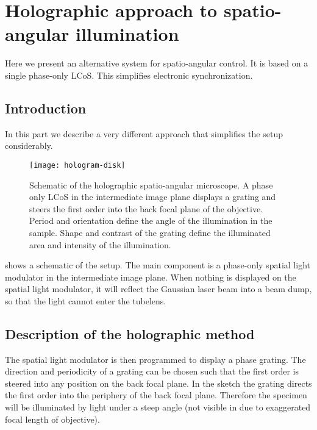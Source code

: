 \chapter{Holographic approach to spatio-angular illumination}
\begin{summary}
  Here we present an alternative system for spatio-angular control. It
  is based on a single phase-only LCoS. This simplifies electronic
  synchronization.
\end{summary}

\section{Introduction}
In this part we describe a very different approach that simplifies the
setup considerably.

\begin{figure}[!hbt]
  \centering
  
  \texttt{[image: hologram-disk]}
  \caption{Schematic of the holographic spatio-angular microscope. A
    phase only LCoS in the intermediate image plane displays a grating
    and steers the first order into the back focal plane of the
    objective. Period and orientation define the angle of the
    illumination in the sample. Shape and contrast of the grating
    define the illuminated area and intensity of the illumination.}
  \label{fig:holo-setup3}
\end{figure}

 shows a schematic of the setup. The main
component is a phase-only spatial light modulator in the intermediate
image plane. When nothing is displayed on the spatial light modulator,
it will reflect the Gaussian laser beam into a beam dump, so that
the light cannot enter the tubelens.

\section{Description of the holographic method}
The spatial light modulator is then programmed to display a phase
grating.  The direction and periodicity of a grating can be chosen
such that the first order is steered into any position on the back
focal plane. In the sketch the grating directs the first order into
the periphery of the back focal plane. Therefore the specimen will be
illuminated by light under a steep angle (not visible in
 due to exaggerated focal length of
objective).

